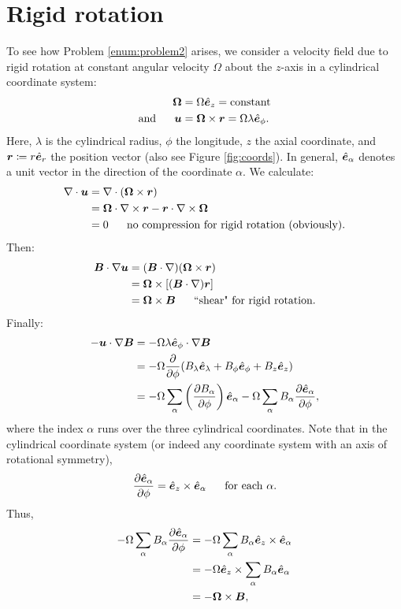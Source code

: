 \documentclass[12pt]{article}
\newcommand{\vecrot}{\bm{\Omega}}
\newcommand{\vecr}{\bm{r}}
\begin{document}
\section{Rigid rotation}
To see how Problem \ref{enum:problem2} arises, we consider a velocity field due to rigid rotation at constant angular velocity $\Omega$ about the $z$-axis in a cylindrical coordinate system:
\begin{subequations}
	\begin{align}
		\vecrot &= \Omega\ez=\text{constant}\\
		\andd \vecu&=\vecrot\times\bm{r} = \Omega\lambda\ep.
	\end{align}
\end{subequations}
Here, $\lambda$ is the cylindrical radius, $\phi$ the longitude, $z$ the axial coordinate, and $\vecr\define r\er$ the position vector (also see Figure \ref{fig:coords}). In general,  $\hat{\bm{e}}_\alpha$ denotes a unit vector in the direction of the coordinate $\alpha$. We calculate:
\begin{align}
	\Div\vecu&=\Div(\vecrot\times\bm{r})\nonumber\\
	&= \vecrot\dotgrad\times\vecr-\vecr\dotgrad\times\vecrot\nonumber\\
	&= 0\five\text{no compression for rigid rotation (obviously).}
\end{align}
Then:
\begin{align}
	\vecb\dotgrad\vecu&=(\vecb\dotgrad)(\vecrot\times\vecr)\nonumber\nonumber\\
	&= \vecrot\times[(\vecb\dotgrad)\vecr]\nonumber\\
	&= \vecrot\times\vecb\five\text{``shear" for rigid rotation}.
\end{align}
Finally:
\begin{align*}
	-\bm{u}\cdot\nabla\bm{B} &= -\Omega\lambda\hat{\bm{e}}_\phi\cdot\nabla\bm{B}\\
	&=-\Omega\frac{\partial}{\partial\phi}(B_\lambda\hat{\bm{e}}_\lambda+B_\phi\hat{\bm{e}}_\phi+B_z\hat{\bm{e}}_z)\\
	&=-\Omega\sum_\alpha\left(\frac{\partial B_\alpha}{\partial\phi}\right)\hat{\bm{e}}_\alpha-\Omega\sum_\alpha B_\alpha\frac{\partial\hat{\bm{e}}_\alpha}{\partial\phi},
\end{align*}
where the index $\alpha$ runs over the three cylindrical coordinates. Note that in the cylindrical coordinate system (or indeed any coordinate system with an axis of rotational symmetry), 
\begin{align}
	\frac{\partial\hat{\bm{e}}_\alpha}{\partial\phi}=\hat{\bm{e}}_z\times\hat{\bm{e}}_\alpha \ \ \ \ \ \text{for each $\alpha$}.
\end{align}
Thus,
\begin{align*}
	-\Omega\sum_\alpha B_\alpha\pderiv{\e_\alpha}{\phi} &= -\Omega\sum_\alpha B_\alpha\ez\times\e_\alpha\\
	&=-\Omega\ez\times\sum_\alpha B_\alpha\e_\alpha\\
	&=-\vecrot\times\vecb,
\end{align*}
\end{document}
